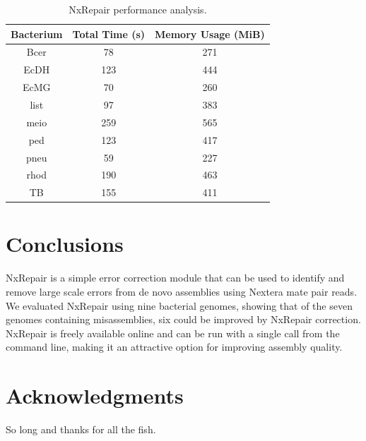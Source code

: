 \documentclass[fleqn,10pt]{wlpeerj}
\begin{document}
\begin{table}
\begin{center}
\begin{tabular}{|c|c|c|}
    \hline
    Bacterium & Total Time (s) & Memory Usage (MiB) \\ \hline
    Bcer & 78 & 271 \\
    EcDH & 123 & 444 \\
    EcMG & 70 & 260 \\
    list & 97 & 383 \\
    meio & 259 & 565 \\
    ped & 123 & 417 \\
    pneu & 59 & 227 \\
    rhod & 190 & 463 \\
    TB & 155 & 411 \\ 
    \hline
\end{tabular}
\end{center}
\caption{NxRepair performance analysis. \label{tab:performance}}
\end{table}

\section*{Conclusions}
NxRepair is a simple error correction module that can be used to identify and remove large scale errors from de novo assemblies using Nextera mate pair reads. We evaluated NxRepair using nine bacterial genomes, showing that of the seven genomes containing misassemblies, six could be improved by NxRepair correction. NxRepair is freely available online and can be run with a single call from the command line, making it an attractive option for improving assembly quality.

\section*{Acknowledgments}

So long and thanks for all the fish.


%
\end{document}
